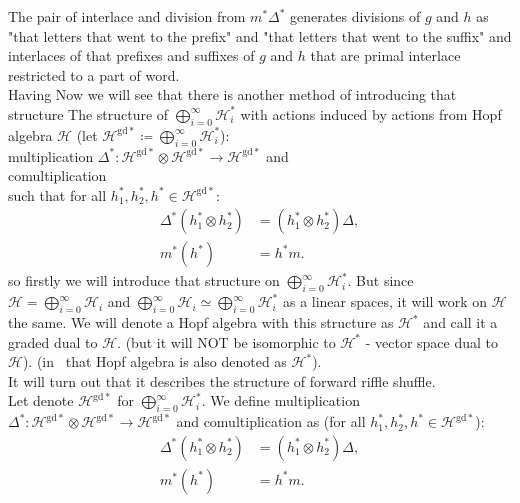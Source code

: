 \documentclass[a4paper]{article}
\newcommand{\gdd}[1]{#1^{\mathrm{gd}*}}
\begin{document}
The pair of interlace and division from $m^*\Delta^*$ generates divisions of $g$ and $h$ as "that letters
that went to the prefix" and "that letters that went to the suffix" and interlaces of that prefixes and suffixes of $g$ and $h$ that are primal interlace restricted to a part of word. \\
Having
Now we will see that there is another method of introducing that structure
The 
structure of $\displaystyle\bigoplus^{\infty}_{i = 0} \mathcal{H}_i^*$ with actions induced by actions from 
Hopf algebra $\mathcal{H}$ (let $\gdd{\mathcal{H}} \coloneqq \displaystyle\bigoplus^{\infty}_{i = 0} \mathcal{H}_i^*$): \\
multiplication 
$\Delta^* : \mathcal{H}^{\mathrm{gd}*} \otimes \gdd{\mathcal{H}} \to \gdd{\mathcal{H}}$ and \\
comultiplication 
\text{$m^* : \gdd{\mathcal{H}} \to \gdd{\mathcal{H}} \otimes \gdd{\mathcal{H}}$} \\
such that for all $h_1^*, h_2^*, h^* \in \gdd{\mathcal{H}}$:
\begin{align*}
\Delta^*(h_1^* \otimes h_2^*) &= (h_1^* \otimes h_2^*)\Delta, \\
m^*(h^*) &= h^*m.
\end{align*} 
so firstly we will introduce that structure on  
$\displaystyle\bigoplus^{\infty}_{i = 0} \mathcal{H}_i^*$. But since $\mathcal{H} = 
\displaystyle\bigoplus^{\infty}_{i = 0} \mathcal{H}_i$ and $\displaystyle\bigoplus^{\infty}_{i = 0}
\mathcal{H}_i \simeq \displaystyle\bigoplus^{\infty}_{i = 0} \mathcal{H}_i^*$ as a linear spaces, it will
work on $\mathcal{H}$ the same. We will denote a Hopf algebra with this structure 
as $\mathcal{H}^*$ and call it a graded dual to $\mathcal{H}$. (but it will NOT be isomorphic to 
$\mathcal{H}^*$ - vector space dual to $\mathcal{H}$). (in~\cite{Diaconis2014} that Hopf algebra is also 
denoted as $\mathcal{H}^*$).  \\
It will turn out that it describes the structure of forward riffle shuffle. \\
\indent Let denote $\gdd{\mathcal{H}}$ for $\displaystyle\bigoplus^{\infty}_{i = 0} \mathcal{H}_i^*$.
We define multiplication 
$\Delta^* : \mathcal{H}^{\mathrm{gd}*} \otimes \gdd{\mathcal{H}} \to \gdd{\mathcal{H}}$ and 
comultiplication 
\text{$m^* : \gdd{\mathcal{H}} \to \gdd{\mathcal{H}} \otimes \gdd{\mathcal{H}}$} as 
(for all $h_1^*, h_2^*, h^* \in \gdd{\mathcal{H}}$):
\begin{align*}
\Delta^*(h_1^* \otimes h_2^*) &= (h_1^* \otimes h_2^*)\Delta, \\
m^*(h^*) &= h^*m.
\end{align*}
\end{document}

